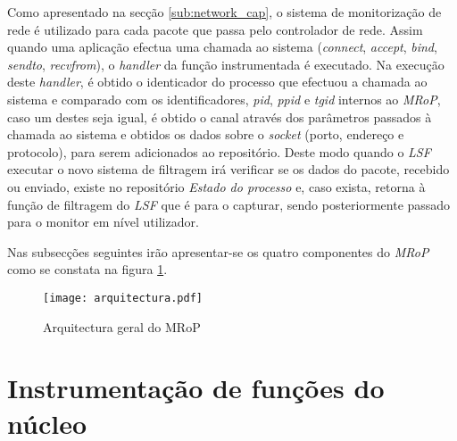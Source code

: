 Como apresentado na secção \ref{sub:network_cap}, o sistema de monitorização de rede é utilizado para cada pacote que passa pelo controlador de rede.
Assim quando uma aplicação efectua uma chamada ao sistema (\textit{connect}, \textit{accept}, \textit{bind}, \textit{sendto}, \textit{recvfrom}), o \textit{handler} da função instrumentada é executado.
Na execução deste \textit{handler}, é obtido o identicador do processo que efectuou a chamada ao sistema e comparado com os identificadores, \textit{pid}, \textit{ppid} e \textit{tgid} internos ao \textit{MRoP}, caso um destes seja igual, é obtido o canal através dos parâmetros passados à chamada ao sistema e obtidos os dados sobre o \textit{socket} (porto, endereço e protocolo), para serem adicionados ao repositório.
Deste modo quando o \textit{LSF} executar o novo sistema de filtragem irá verificar se os dados do pacote, recebido ou enviado, existe no repositório \textit{Estado do processo} e, caso exista, retorna à função de filtragem do \textit{LSF} que é para o capturar, sendo posteriormente passado para o monitor em nível utilizador.




Nas subsecções seguintes irão apresentar-se os quatro componentes do \textit{MRoP} como se constata na figura \ref{fig:general_architecture}.

\begin{figure}[!htbp]
\centering
\texttt{[image: arquitectura.pdf]}
\caption{Arquitectura geral do MRoP}
\label{fig:general_architecture}
\end{figure}



\section{Instrumentação de funções do núcleo}




